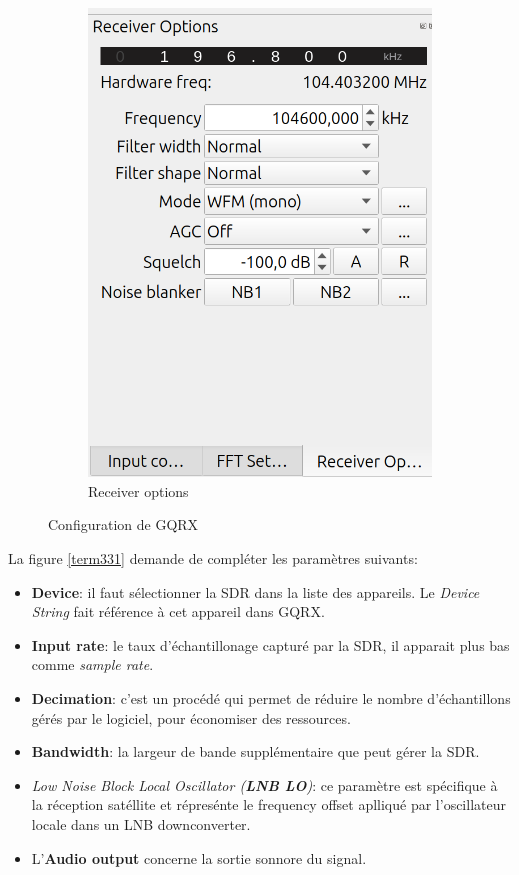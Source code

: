 \begin{figure}[h]
\begin{subfigure}{0.4\textwidth}
  \includegraphics[width=\textwidth]{images/gqrx3.png}
  \caption{Receiver options}
  \label{term341}
\end{subfigure}
\caption{Configuration de GQRX}
\label{term37}
\end{figure}

La figure \ref{term331} demande de compléter les paramètres suivants:

\vspace{0.1cm}

\begin{itemize}
\item \textbf{Device}: il faut sélectionner la SDR dans la liste des appareils. Le \textit{Device String} fait référence à cet appareil dans GQRX.
\item \textbf{Input rate}: le taux d'échantillonage capturé par la SDR, il apparait plus bas comme \textit{sample rate}.
\item \textbf{Decimation}: c'est un procédé qui permet de réduire le nombre d'échantillons gérés par le logiciel, pour économiser des ressources.
\item \textbf{Bandwidth}: la largeur de bande supplémentaire que peut gérer la SDR.
\item \textit{Low Noise Block Local Oscillator (\textbf{LNB LO})}: ce paramètre est spécifique à la réception satéllite et répresénte le frequency offset aplliqué par l'oscillateur locale dans un LNB downconverter.
\item L'\textbf{Audio output} concerne la sortie sonnore du signal.
\end{itemize}

